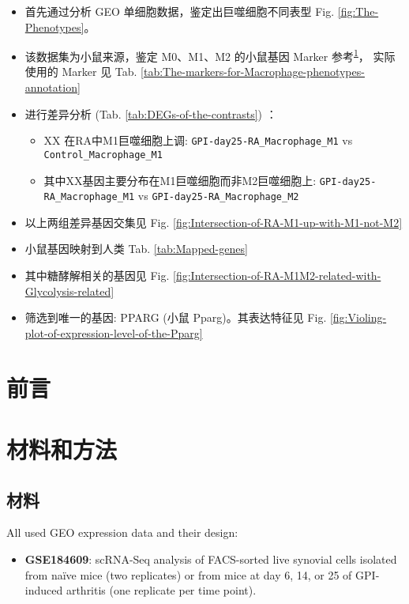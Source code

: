\documentclass[
]{article}
\providecommand{\tightlist}{%
  \setlength{\itemsep}{0pt}\setlength{\parskip}{0pt}}
\begin{document}
\begin{itemize}
\tightlist
\item
  首先通过分析 GEO 单细胞数据，鉴定出巨噬细胞不同表型 Fig. \ref{fig:The-Phenotypes}。
\item
  该数据集为小鼠来源，鉴定 M0、M1、M2 的小鼠基因 Marker 参考\textsuperscript{\protect\hyperlink{ref-NovelMarkersTJablon2015}{1}}，
  实际使用的 Marker 见 Tab. \ref{tab:The-markers-for-Macrophage-phenotypes-annotation}
\item
  进行差异分析 (Tab. \ref{tab:DEGs-of-the-contrasts}) ：

  \begin{itemize}
  \tightlist
  \item
    XX 在RA中M1巨噬细胞上调: \texttt{GPI-day25-RA\_Macrophage\_M1} vs \texttt{Control\_Macrophage\_M1}
  \item
    其中XX基因主要分布在M1巨噬细胞而非M2巨噬细胞上: \texttt{GPI-day25-RA\_Macrophage\_M1} vs \texttt{GPI-day25-RA\_Macrophage\_M2}
  \end{itemize}
\item
  以上两组差异基因交集见 Fig. \ref{fig:Intersection-of-RA-M1-up-with-M1-not-M2}
\item
  小鼠基因映射到人类 Tab. \ref{tab:Mapped-genes}
\item
  其中糖酵解相关的基因见 Fig. \ref{fig:Intersection-of-RA-M1M2-related-with-Glycolysis-related}
\item
  筛选到唯一的基因: PPARG (小鼠 Pparg)。其表达特征见 Fig. \ref{fig:Violing-plot-of-expression-level-of-the-Pparg}
\end{itemize}

\hypertarget{introduction}{%
\section{前言}\label{introduction}}

\hypertarget{methods}{%
\section{材料和方法}\label{methods}}

\hypertarget{ux6750ux6599}{%
\subsection{材料}\label{ux6750ux6599}}

All used GEO expression data and their design:

\begin{itemize}
\tightlist
\item
  \textbf{GSE184609}: scRNA-Seq analysis of FACS-sorted live synovial cells isolated from naïve mice (two replicates) or from mice at day 6, 14, or 25 of GPI-induced arthritis (one replicate per time point).
\end{itemize}
\end{document}
